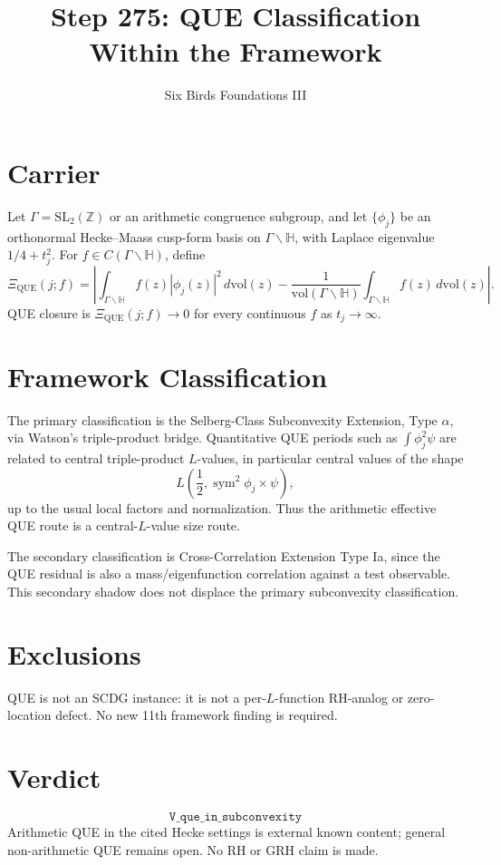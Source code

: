 \documentclass[11pt]{article}
\title{Step 275: QUE Classification Within the Framework}
\author{Six Birds Foundations III}
\date{}
\begin{document}
\maketitle

\section*{Carrier}
Let \(\Gamma=\mathrm{SL}_2(\mathbb Z)\) or an arithmetic congruence subgroup, and let
\(\{\phi_j\}\) be an orthonormal Hecke--Maass cusp-form basis on
\(\Gamma\backslash\mathbb H\), with Laplace eigenvalue \(1/4+t_j^2\).  For
\(f\in C(\Gamma\backslash\mathbb H)\), define
\[
\Xi_{\mathrm{QUE}}(j;f)=
\left|\int_{\Gamma\backslash\mathbb H} f(z)|\phi_j(z)|^2\,d\mathrm{vol}(z)
-\frac{1}{\mathrm{vol}(\Gamma\backslash\mathbb H)}
\int_{\Gamma\backslash\mathbb H}f(z)\,d\mathrm{vol}(z)\right|.
\]
QUE closure is \(\Xi_{\mathrm{QUE}}(j;f)\to 0\) for every continuous \(f\) as
\(t_j\to\infty\).

\section*{Framework Classification}
The primary classification is the Selberg-Class Subconvexity Extension, Type
\(\alpha\), via Watson's triple-product bridge.  Quantitative QUE periods such as
\(\int \phi_j^2\psi\) are related to central triple-product \(L\)-values, in
particular central values of the shape
\[
L\!\left(\frac12,\operatorname{sym}^2\phi_j\times\psi\right),
\]
up to the usual local factors and normalization.  Thus the arithmetic effective
QUE route is a central-\(L\)-value size route.

The secondary classification is Cross-Correlation Extension Type Ia, since the
QUE residual is also a mass/eigenfunction correlation against a test observable.
This secondary shadow does not displace the primary subconvexity classification.

\section*{Exclusions}
QUE is not an SCDG instance: it is not a per-\(L\)-function RH-analog or
zero-location defect.  No new 11th framework finding is required.

\section*{Verdict}
\[
\boxed{\texttt{V\_que\_in\_subconvexity}}
\]
Arithmetic QUE in the cited Hecke settings is external known content; general
non-arithmetic QUE remains open.  No RH or GRH claim is made.
\end{document}
